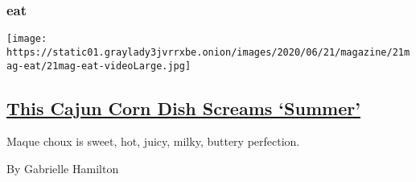 \begin{enumerate}
{  \subsubsection{eat}\label{eat}}

  \texttt{[image: https://static01.graylady3jvrrxbe.onion/images/2020/06/21/magazine/21mag-eat/21mag-eat-videoLarge.jpg]}

  \hypertarget{this-cajun-corn-dish-screams-summer}{%
  \subsection{\texorpdfstring{\href{/2020/06/17/magazine/this-cajun-corn-dish-screams-summer.html}{This
  Cajun Corn Dish Screams
  `Summer'}}{This Cajun Corn Dish Screams `Summer'}}\label{this-cajun-corn-dish-screams-summer}}

  Maque choux is sweet, hot, juicy, milky, buttery perfection.

  By Gabrielle Hamilton
\end{enumerate}

